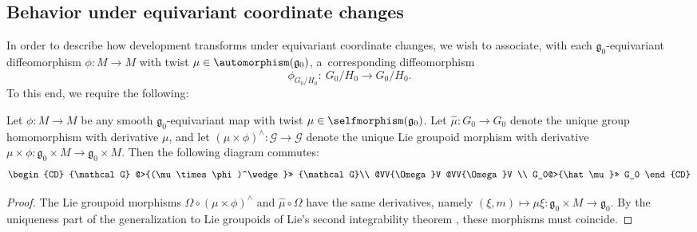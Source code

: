 \subsection{Behavior under equivariant coordinate changes}\label{yut}
In order to describe how development transforms under
equivariant coordinate changes, we wish to associate, with each
${\mathfrak g}_0$-equivariant dif\/feomorphism $\phi \colon M
\rightarrow M$ with twist $\mu \in \automorphism ({\mathfrak g}_0)$, a~corresponding dif\/feomorphism
\[
\phi_{G_0/H_0}\colon \ {G_0/H_0}
\rightarrow {G_0/H_0}.
\]
 To this end, we require the following:

\begin{LemmaBlaom}\label{LemmaA}
  Let $\phi \colon M \rightarrow M$ be any smooth ${\mathfrak
    g}_0$-equivariant map with twist $\mu \in \selfmorphism({\mathfrak
    g}_0)$. Let $\hat\mu \colon G_0 \rightarrow G_0$ denote the unique
  group homomorphism with derivative $\mu$, and let $(\mu \times
  \phi)^\wedge \colon {\mathcal G} \rightarrow {\mathcal G} $ denote
  the unique Lie groupoid morphism with derivative $\mu \times \phi \colon
  {\mathfrak g}_0 \times M \rightarrow {\mathfrak g}_0 \times M$. Then
  the following diagram commutes:
\begin{gather*}
  \begin{CD}
    {\mathcal G}   @>{(\mu \times \phi)^\wedge}>> {\mathcal G}\\
    @VV{\Omega}V @VV{\Omega}V \\
    G_0@>{\hat\mu}>> G_0
  \end{CD}
\end{gather*}
\end{LemmaBlaom}

\begin{proof}
  The Lie groupoid morphisms $\Omega \circ (\mu \times \phi)^\wedge$ and
  $\hat\mu \circ \Omega$ have the same derivatives, namely
  $(\xi,m)\mapsto \mu \xi \colon {\mathfrak g}_0 \times M \rightarrow
  {\mathfrak g}_0 $. By the uniqueness part of the generalization to
  Lie groupoids of Lie's second integrability theorem \cite[Lie~II]{Crainic_Fernandes_11}, these morphisms must coincide.
\end{proof}

